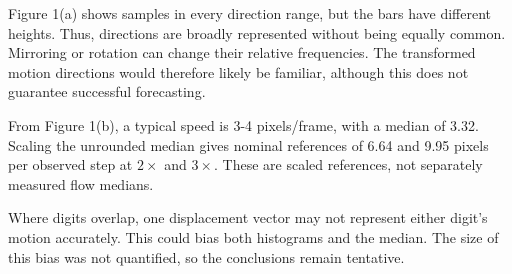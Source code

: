 Figure 1(a) shows samples in every direction range, but the bars have different heights. Thus, directions are broadly represented without being equally common. Mirroring or rotation can change their relative frequencies. The transformed motion directions would therefore likely be familiar, although this does not guarantee successful forecasting.

From Figure 1(b), a typical speed is 3-4 pixels/frame, with a median of 3.32. Scaling the unrounded median gives nominal references of 6.64 and 9.95 pixels per observed step at $2\times$ and $3\times$. These are scaled references, not separately measured flow medians.

Where digits overlap, one displacement vector may not represent either digit's motion accurately. This could bias both histograms and the median. The size of this bias was not quantified, so the conclusions remain tentative.
